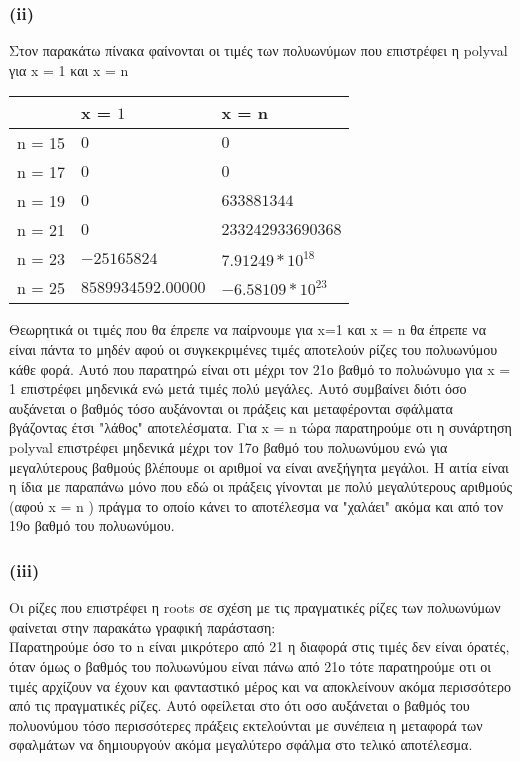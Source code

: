 \documentclass{article}
\begin{document}
\subsubsection*{(ii)}
Στον παρακάτω πίνακα φαίνονται οι τιμές των πολυωνύμων που επιστρέφει η polyval για  x = 1 και  x = n
\begin{center}
 \begin{tabular}{ | l | l | l |}
    \hline
     & x = $1$ & x = n\\ \hline
    n = 15 & $0$ & $0$\\ \hline
    n = 17 & $0$ & $0$\\ \hline
    n = 19 & $0$ & $633881344$\\\hline
    n = 21 & $0$ & $233242933690368$\\\hline
    n = 23 & $-25165824$ & $7.91249*10^{18}$\\\hline
    n = 25 & $8589934592.00000$ & $-6.58109*10^{23}$\\\hline
    \end{tabular}
    \end{center}
Θεωρητικά οι τιμές που θα έπρεπε να παίρνουμε για x=1 και x = n θα έπρεπε να είναι πάντα το μηδέν αφού οι συγκεκριμένες τιμές αποτελούν ρίζες του πολυωνύμου κάθε φορά. Αυτό που παρατηρώ είναι οτι μέχρι τον 21ο βαθμό το πολυώνυμο για x = 1 επιστρέφει μηδενικά ενώ μετά τιμές πολύ μεγάλες. Αυτό συμβαίνει διότι όσο αυξάνεται ο βαθμός τόσο αυξάνονται οι πράξεις και μεταφέρονται σφάλματα βγάζοντας έτσι "λάθος" αποτελέσματα. Για x = n τώρα παρατηρούμε οτι η συνάρτηση polyval επιστρέφει μηδενικά μέχρι τον 17ο βαθμό του πολυωνύμου ενώ για μεγαλύτερους βαθμούς βλέπουμε οι αριθμοί να είναι ανεξήγητα μεγάλοι. Η αιτία είναι η ίδια με παραπάνω μόνο που εδώ οι πράξεις γίνονται με πολύ μεγαλύτερους αριθμούς (αφού x = n ) πράγμα το οποίο κάνει το αποτέλεσμα να "χαλάει" ακόμα και από τον 19ο βαθμό του πολυωνύμου.
\subsubsection*{(iii)} 
Οι ρίζες που επιστρέφει η  roots  σε σχέση με τις πραγματικές ρίζες των πολυωνύμων φαίνεται στην παρακάτω γραφική παράσταση:\\
Παρατηρούμε όσο το  n 
 είναι μικρότερο από 21 η διαφορά στις τιμές δεν είναι όρατές, όταν όμως ο βαθμός του πολυωνύμου είναι πάνω από 21ο τότε παρατηρούμε οτι οι τιμές αρχίζουν να έχουν και φανταστικό μέρος και να αποκλείνουν ακόμα περισσότερο από τις πραγματικές ρίζες. Αυτό οφείλεται στο ότι οσο αυξάνεται ο βαθμός του πολυονύμου τόσο περισσότερες πράξεις εκτελούνται με συνέπεια η μεταφορά των σφαλμάτων να δημιουργούν ακόμα μεγαλύτερο σφάλμα στο τελικό αποτέλεσμα. 
\end{document}
